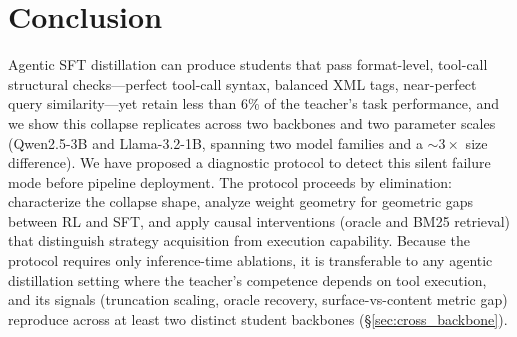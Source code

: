 \section{Conclusion}
\label{sec:conclusion}

Agentic SFT distillation can produce students that pass format-level, tool-call structural checks---perfect tool-call syntax, balanced XML tags, near-perfect query similarity---yet retain less than 6\% of the teacher's task performance, and we show this collapse replicates across two backbones and two parameter scales (Qwen2.5-3B and Llama-3.2-1B, spanning two model families and a ${\sim}3\times$ size difference). We have proposed a diagnostic protocol to detect this silent failure mode before pipeline deployment. The protocol proceeds by elimination: characterize the collapse shape, analyze weight geometry for geometric gaps between RL and SFT, and apply causal interventions (oracle and BM25 retrieval) that distinguish strategy acquisition from execution capability. Because the protocol requires only inference-time ablations, it is transferable to any agentic distillation setting where the teacher's competence depends on tool execution, and its signals (truncation scaling, oracle recovery, surface-vs-content metric gap) reproduce across at least two distinct student backbones (\S\ref{sec:cross_backbone}).


